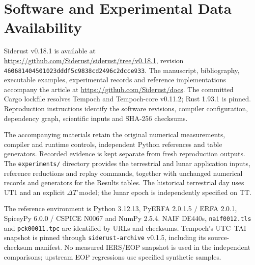\appendix
\section{Software and Experimental Data Availability}
\label{sec:availability}

Siderust v0.18.1 is available at \url{https://github.com/Siderust/siderust/tree/v0.18.1}, revision
\texttt{460681404501023dddf5c9838cd2496c2dcce933}. The manuscript, bibliography, executable
examples, experimental records and reference implementations accompany the article at
\url{https://github.com/Siderust/docs}. The committed Cargo lockfile resolves Tempoch and
Tempoch-core v0.11.2; Rust 1.93.1 is pinned. Reproduction instructions identify the software
revisions, compiler configuration, dependency graph, scientific inputs and SHA-256 checksums.

The accompanying materials retain the original numerical measurements, compiler and runtime
controls, independent Python references and table generators. Recorded evidence is kept separate
from fresh reproduction outputs. The \texttt{experiments/} directory provides the terrestrial and
lunar application inputs, reference reductions and replay commands, together with unchanged
numerical records and generators for the Results tables. The historical terrestrial day uses UT1
and an explicit $\Delta T$ model; the lunar epoch is independently specified on TT.

The reference environment is Python 3.12.13, PyERFA 2.0.1.5 / ERFA 2.0.1, SpiceyPy 6.0.0 / CSPICE
N0067 and NumPy 2.5.4. NAIF DE440s, \texttt{naif0012.tls} and \texttt{pck00011.tpc} are identified
by URLs and checksums. Tempoch's UTC--TAI snapshot is pinned through \texttt{siderust-archive}
v0.1.5, including its source-checksum manifest. No measured IERS/EOP snapshot is used in the
independent comparisons; upstream EOP regressions use specified synthetic samples.
